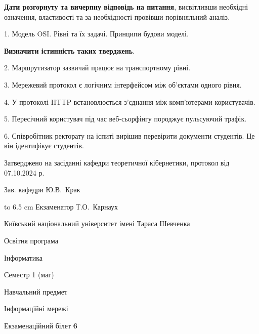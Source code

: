 \documentclass[12pt, ukrainian]{article}
\begin{document}
{
\qquad\textbf{Дати розгорнуту та вичерпну відповідь на питання}, висвітливши необхідні означення, властивості та за необхідності провівши порівняльний аналіз.

1. Модель OSI. Рівні та їх задачі. Принципи будови моделі.



\qquad\textbf{Визначити істинність таких тверджень}.

2. Маршрутизатор зазвичай працює на транспортному рівні.


3. Мережевий протокол є логічним інтерфейсом між об'єктами одного рівня.


4. У протоколі HTTP встановлюється з'єднання між комп'ютерами користувачів.


5. Пересічний користувач під час веб-сьорфінгу породжує пульсуючий трафік.


6. Співробітник ректорату на іспиті вирішив перевірити документи студентів. Це він ідентифікує студентів.

}
{\smallskip\smallskip \begin {scriptsize} Затверджено на засіданні кафедри теоретичної кібернетики, протокол   від   07.10.2024 р.\par\smallskip\smallskip\smallskip\smallskip
{\parbox {6.5 cm} {Зав. кафедри \dotfill Ю.В.~Крак}}\hspace {0.7cm} {\hbox to 6.5 cm { Екзаменатор \dotfill Т.О.~Карнаух}} \end{scriptsize}}
\vspace{0.9cm}
{{\begin {scriptsize}\par
{ \center  Київський національний університет імені Тараса Шевченка \par}
{\parbox {5 cm}{Освітня програма \hfill}{\parbox {7 cm}{Інформатика\hfill}}\parbox {6 cm}{\hfill Семестр 1 (маг)}}\par
{\parbox {5 cm} {Навчальний предмет \hfill}\parbox {7 cm}{Інформаційні мережі \hfill}\parbox {6cm}{\hfill}\par}\vspace{-15pt} \end{scriptsize}}{\center Екзаменаційний білет \No \textbf { 6 }\par}}
\end{document}
